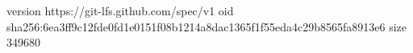 version https://git-lfs.github.com/spec/v1
oid sha256:6ea3ff9c12fde0fd1e0151f08b1214a8dac1365f1f55eda4c29b8565fa8913e6
size 349680

